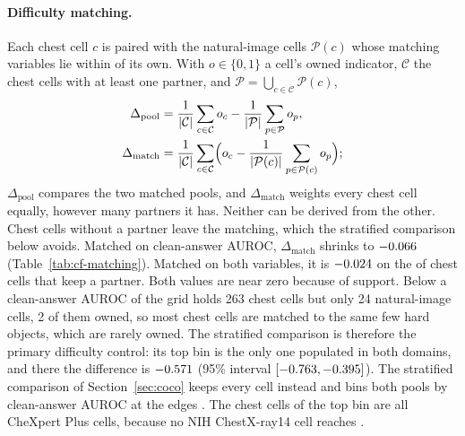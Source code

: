 \paragraph{Difficulty matching.} Each chest cell $c$ is paired with the natural-image cells $\mathcal P(c)$ whose matching variables lie within \cfFgWindow{} of its own. With $o\in\{0,1\}$ a cell's owned indicator, $\mathcal C$ the chest cells with at least one partner, and $\mathcal P=\bigcup_{c\in\mathcal C}\mathcal P(c)$,
\begin{equation}
\begin{aligned}
\Delta_{\text{pool}}&=\frac{1}{|\mathcal C|}\sum_{c\in\mathcal C}o_c-\frac{1}{|\mathcal P|}\sum_{p\in\mathcal P}o_p,\\
\Delta_{\text{match}}&=\frac{1}{|\mathcal C|}\sum_{c\in\mathcal C}\Bigl(o_c-\frac{1}{|\mathcal P(c)|}\sum_{p\in\mathcal P(c)}o_p\Bigr);
\end{aligned}
\label{eq:matching}
\end{equation}
$\Delta_{\text{pool}}$ compares the two matched pools, and $\Delta_{\text{match}}$ weights every chest cell equally, however many partners it has. Neither can be derived from the other. Chest cells without a partner leave the matching, which the stratified comparison below avoids. Matched on clean-answer AUROC, $\Delta_{\text{match}}$ shrinks to $-0.066$ (Table~\ref{tab:cf-matching}). Matched on both variables, it is $-0.024$ on the \cfFgMatchBothN{} of \cfFgMatchBothCells{} chest cells that keep a partner. Both values are near zero because of support. Below a clean-answer AUROC of \cfStratTopEdge{} the grid holds 263 chest cells but only 24 natural-image cells, 2 of them owned, so most chest cells are matched to the same few hard objects, which are rarely owned. The stratified comparison is therefore the primary difficulty control: its top bin is the only one populated in both domains, and there the difference is $-0.571$ (95\% interval $[-0.763,-0.395]$). The stratified comparison of Section~\ref{sec:coco} keeps every cell instead and bins both pools by clean-answer AUROC at the edges \cfStratEdges{}. The \cfStratChestTopN{} chest cells of the top bin are all CheXpert Plus cells, because no NIH ChestX-ray14 cell reaches \cfStratTopEdge{}.


